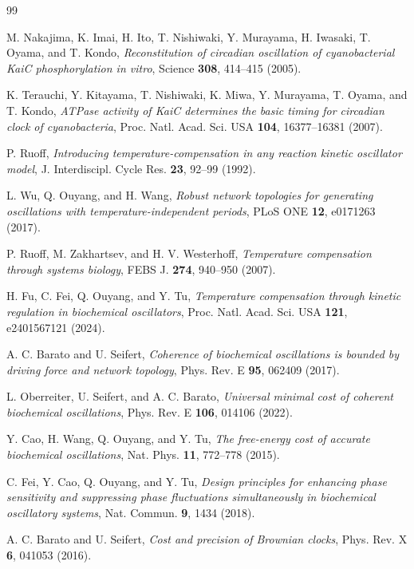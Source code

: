 \documentclass[11pt,onecolumn]{article}
\theoremstyle{definition}
\begin{document}
\begin{thebibliography}{99}

 M. Nakajima, K. Imai, H. Ito, T. Nishiwaki, Y. Murayama, H. Iwasaki, T. Oyama, and T. Kondo, \emph{Reconstitution of circadian oscillation of cyanobacterial KaiC phosphorylation in vitro}, Science \textbf{308}, 414--415 (2005).

 K. Terauchi, Y. Kitayama, T. Nishiwaki, K. Miwa, Y. Murayama, T. Oyama, and T. Kondo, \emph{ATPase activity of KaiC determines the basic timing for circadian clock of cyanobacteria}, Proc. Natl. Acad. Sci. USA \textbf{104}, 16377--16381 (2007).

 P. Ruoff, \emph{Introducing temperature-compensation in any reaction kinetic oscillator model}, J. Interdiscipl. Cycle Res. \textbf{23}, 92--99 (1992).

 L. Wu, Q. Ouyang, and H. Wang, \emph{Robust network topologies for generating oscillations with temperature-independent periods}, PLoS ONE \textbf{12}, e0171263 (2017).

 P. Ruoff, M. Zakhartsev, and H. V. Westerhoff, \emph{Temperature compensation through systems biology}, FEBS J. \textbf{274}, 940--950 (2007).

 H. Fu, C. Fei, Q. Ouyang, and Y. Tu, \emph{Temperature compensation through kinetic regulation in biochemical oscillators}, Proc. Natl. Acad. Sci. USA \textbf{121}, e2401567121 (2024).

 A. C. Barato and U. Seifert, \emph{Coherence of biochemical oscillations is bounded by driving force and network topology}, Phys. Rev. E \textbf{95}, 062409 (2017).

 L. Oberreiter, U. Seifert, and A. C. Barato, \emph{Universal minimal cost of coherent biochemical oscillations}, Phys. Rev. E \textbf{106}, 014106 (2022).

 Y. Cao, H. Wang, Q. Ouyang, and Y. Tu, \emph{The free-energy cost of accurate biochemical oscillations}, Nat. Phys. \textbf{11}, 772--778 (2015).

 C. Fei, Y. Cao, Q. Ouyang, and Y. Tu, \emph{Design principles for enhancing phase sensitivity and suppressing phase fluctuations simultaneously in biochemical oscillatory systems}, Nat. Commun. \textbf{9}, 1434 (2018).

 A. C. Barato and U. Seifert, \emph{Cost and precision of Brownian clocks}, Phys. Rev. X \textbf{6}, 041053 (2016).


\end{thebibliography}
\end{document}

